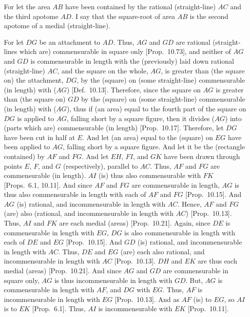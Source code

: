 \begin{Parallel}{}{}
{\epsfysize=1.3in
\centerline{}

For let the area $AB$ have been contained by the rational (straight-line)
$AC$ and the third apotome $AD$. I say that the square-root of area $AB$
is the second apotome of a medial (straight-line).

For let $DG$ be an attachment to $AD$. Thus, $AG$ and $GD$ are rational (straight-lines which are) commensurable in square only [Prop.~10.73], and neither of $AG$ and $GD$
is commensurable in length with the (previously) laid down rational (straight-line) $AC$, and the square on the whole, $AG$, is greater than
(the square on) the attachment, $DG$, by the (square) on (some straight-line)
commensurable (in length) with ($AG$) [Def.~10.13]. 
Therefore, since the square on $AG$ is greater than (the square on)
$GD$ by the (square) on (some straight-line) commensurable (in length)
with ($AG$), thus if (an area) equal to the fourth part of the square on $DG$
is applied to $AG$, falling short by a square figure, then it divides ($AG$)
into (parts which are) commensurable (in length) [Prop.~10.17]. Therefore, let $DG$ have been
cut in half at $E$. And let (an area) equal to the (square) on $EG$
have been applied to $AG$, falling short by a square figure.
And let it be the (rectangle contained) by $AF$ and $FG$. And let
$EH$, $FI$, and $GK$ have been drawn through points $E$, $F$, and $G$
(respectively), parallel to $AC$. Thus, $AF$ and $FG$ are
commensurable (in length). $AI$ (is) thus also commensurable with
$FK$ [Props.~6.1, 10.11]. 
 And since $AF$ and $FG$ are commensurable
in length, $AG$ is thus also commensurable in length with each of
$AF$ and $FG$ [Prop.~10.15]. And
$AG$ (is) rational, and incommensurable in length with $AC$. 
Hence, $AF$ and $FG$ (are) also (rational, and incommensurable in length
with $AC$) [Prop.~10.13]. 
Thus, $AI$ and $FK$ are each medial (areas) [Prop.~10.21]. Again, since $DE$ is commensurable
in length with $EG$, $DG$ is also commensurable
in length with each of $DE$ and $EG$ [Prop.~10.15]. And $GD$ (is) rational, and incommensurable in length with $AC$. Thus, $DE$ and $EG$ (are)
each also rational, and incommensurable in length with $AC$ [Prop.~10.13]. $DH$ and $EK$ are thus
each medial (areas) [Prop.~10.21]. And since 
$AG$ and $GD$ are commensurable in square only, $AG$ is thus
incommensurable in length with $GD$. But, $AG$ is commensurable in
length with $AF$, and $DG$ with $EG$. Thus, $AF$ is incommensurable
in length with $EG$ [Prop.~10.13]. 
And as $AF$ (is) to $EG$, so $AI$ is to $EK$ [Prop.~6.1]. Thus, $AI$ is incommensurable with $EK$ [Prop.~10.11].

}
\end{Parallel}
